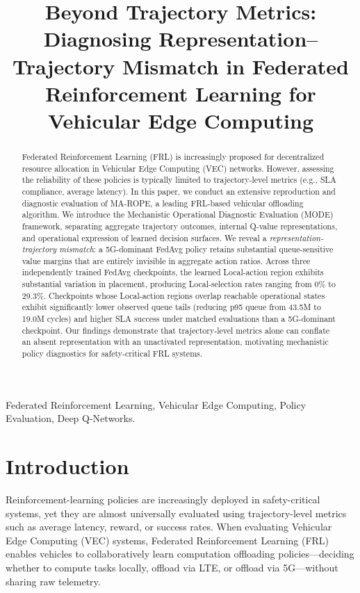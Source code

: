 \documentclass[conference]{IEEEtran}
\begin{document}
\title{Beyond Trajectory Metrics: Diagnosing Representation--Trajectory Mismatch in Federated Reinforcement Learning for Vehicular Edge Computing}

\author{}

\maketitle

\begin{abstract}
Federated Reinforcement Learning (FRL) is increasingly proposed for decentralized resource allocation in Vehicular Edge Computing (VEC) networks. However, assessing the reliability of these policies is typically limited to trajectory-level metrics (e.g., SLA compliance, average latency). In this paper, we conduct an extensive reproduction and diagnostic evaluation of MA-ROPE, a leading FRL-based vehicular offloading algorithm. We introduce the Mechanistic Operational Diagnostic Evaluation (MODE) framework, separating aggregate trajectory outcomes, internal Q-value representations, and operational expression of learned decision surfaces. We reveal a \textit{representation-trajectory mismatch}: a 5G-dominant FedAvg policy retains substantial queue-sensitive value margins that are entirely invisible in aggregate action ratios. Across three independently trained FedAvg checkpoints, the learned Local-action region exhibits substantial variation in placement, producing Local-selection rates ranging from 0\% to 29.3\%. Checkpoints whose Local-action regions overlap reachable operational states exhibit significantly lower observed queue tails (reducing p95 queue from 43.5M to 19.0M cycles) and higher SLA success under matched evaluations than a 5G-dominant checkpoint. Our findings demonstrate that trajectory-level metrics alone can conflate an absent representation with an unactivated representation, motivating mechanistic policy diagnostics for safety-critical FRL systems.
\end{abstract}

\begin{IEEEkeywords}
Federated Reinforcement Learning, Vehicular Edge Computing, Policy Evaluation, Deep Q-Networks.
\end{IEEEkeywords}

\section{Introduction}
Reinforcement-learning policies are increasingly deployed in safety-critical systems, yet they are almost universally evaluated using trajectory-level metrics such as average latency, reward, or success rates. When evaluating Vehicular Edge Computing (VEC) systems, Federated Reinforcement Learning (FRL) enables vehicles to collaboratively learn computation offloading policies---deciding whether to compute tasks locally, offload via LTE, or offload via 5G---without sharing raw telemetry. 
\end{document}
